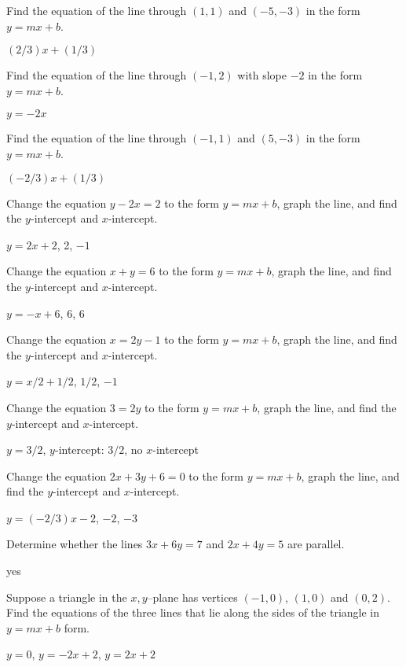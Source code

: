 \begin{exercises}

\exercise Find the equation of the line through $(1,1)$ and $(-5, -3)$ in
the form $y=mx+b$.
\begin{answer} $(2/3)x+(1/3)$
\end{answer}

\exercise Find the equation of the line through $(-1,2)$ with slope $-2$ in
the form $y=mx+b$.
\begin{answer} $y=-2x$
\end{answer}

\exercise Find the equation of the line through $(-1,1)$ and $(5, -3)$ in
the form $y=mx+b$.
\begin{answer} $(-2/3)x+(1/3)$
\end{answer}


\exercise Change the equation $y-2x=2$ to the form $y=mx+b$, graph the
line, and find the $y$-intercept and $x$-intercept.
\begin{answer} $y=2x+2$, 2, $-1$
\end{answer}

\exercise Change the equation $x+y=6$ to the form $y=mx+b$, graph the
line, and find the $y$-intercept and $x$-intercept.
\begin{answer} $y=-x+6$, 6, 6
\end{answer}


\exercise Change the equation $x=2y-1$ to the form $y=mx+b$, graph the
line, and find the $y$-intercept and $x$-intercept.
\begin{answer} $y=x/2+1/2$, $1/2$, $-1$
\end{answer}

\exercise Change the equation $3=2y$ to the form $y=mx+b$, graph the
line, and find the $y$-intercept and $x$-intercept.
\begin{answer} $y=3/2$, $y$-intercept: $3/2$, no $x$-intercept
\end{answer}


\exercise Change the equation $2x+3y+6=0$ to the form $y=mx+b$, graph the
line, and find the $y$-intercept and $x$-intercept.
\begin{answer} $y=(-2/3)x-2$, $-2$, $-3$
\end{answer}

\exercise Determine whether the lines $3x+6y=7$ and $2x+4y=5$ are parallel.
\begin{answer} yes
\end{answer}

\exercise Suppose a triangle in the $x,y$--plane has vertices $(-1,0)$,
$(1,0)$ and $(0,2)$.  Find the equations of the three lines that lie along
 the sides of the triangle in $y=mx+b$ form.
\begin{answer} $y=0$, $y=-2x+2$, $y=2x+2$
\end{answer}


\end{exercises}
